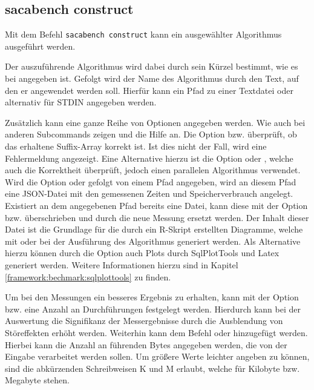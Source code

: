 \subsection{sacabench construct}
\label{framework:cli:sacabench-construct}

Mit dem Befehl \texttt{sacabench construct} kann ein ausgewählter Algorithmus ausgeführt werden. 
\par
Der auszuführende Algorithmus wird dabei durch sein Kürzel bestimmt, wie es bei  angegeben ist. 
Gefolgt wird der Name des Algorithmus durch den Text, auf den er angewendet werden soll. 
Hierfür kann ein Pfad zu einer Textdatei oder alternativ \termfont{-} für STDIN angegeben werden. 
\par
Zusätzlich kann eine ganze Reihe von Optionen angegeben werden. 
Wie auch bei anderen Subcommands zeigen  und  die Hilfe an. 
Die Option  bzw.  überprüft, ob das erhaltene Suffix-Array korrekt ist. 
Ist dies nicht der Fall, wird eine Fehlermeldung angezeigt. 
Eine Alternative hierzu ist die Option  oder , welche auch die Korrektheit überprüft, jedoch einen parallelen Algorithmus verwendet. 
Wird die Option  oder  gefolgt von einem Pfad angegeben, wird an diesem Pfad eine JSON-Datei mit den gemessenen Zeiten und Speicherverbrauch angelegt. 
Existiert an dem angegebenen Pfad bereits eine Datei, kann diese mit der Option  bzw.  überschrieben und durch die neue Messung ersetzt werden. 
Der Inhalt dieser Datei ist die Grundlage für die durch ein R-Skript erstellten Diagramme, welche mit  oder  bei der Ausführung des Algorithmus generiert werden. 
Als Alternative hierzu können durch die Option  auch Plots durch SqlPlotTools und Latex generiert werden.
Weitere Informationen hierzu sind in Kapitel \ref{framework:bechmark:sqlplottools} zu finden.\par
Um bei den Messungen ein besseres Ergebnis zu erhalten, kann mit der Option  bzw.  eine Anzahl an Durchführungen festgelegt werden. 
Hierdurch kann bei der Auswertung die Signifikanz der Messergebnisse durch die Ausblendung von Störeffekten erhöht werden.
Weiterhin kann dem Befehl  oder  hinzugefügt werden. 
Hierbei kann die Anzahl an führenden Bytes angegeben werden, die von der Eingabe verarbeitet werden sollen.
Um größere Werte leichter angeben zu können, sind die abkürzenden Schreibweisen K und M erlaubt, welche für Kilobyte bzw. Megabyte stehen.
